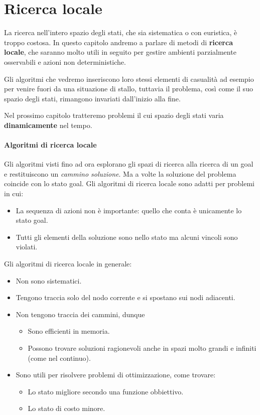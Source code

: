 \chapter{Ricerca locale} \label{chapter: ricerca_locale}
La ricerca nell'intero spazio degli stati, che sia sistematica o con euristica,
\`e troppo costosa. In questo capitolo andremo a parlare di metodi di \textbf{ricerca locale},
che saranno molto utili in seguito per gestire ambienti parzialmente osservabili e azioni non
deterministiche.

Gli algoritmi che vedremo inseriscono loro stessi elementi di casualit\`a ad esempio per venire
fuori da una situazione di stallo, tuttavia il problema, cos\`i come il suo spazio degli stati,
rimangono invariati dall'inizio alla fine.

Nel prossimo capitolo tratteremo problemi il cui spazio degli stati varia \textbf{dinamicamente} nel tempo.

\subsubsection{Algoritmi di ricerca locale}
Gli algoritmi visti fino ad ora esplorano gli spazi di ricerca alla ricerca di un
goal e restituiscono un \emph{cammino soluzione}. Ma a volte la soluzione del problema
coincide con lo stato goal. Gli algoritmi di ricerca locale sono adatti per problemi in
cui:
\begin{itemize}
	\item La sequenza di azioni non \`e importante: quello che conta \`e unicamente
	      lo stato goal.
	\item Tutti gli elementi della soluzione sono nello stato ma alcuni vincoli sono
	      violati.
\end{itemize}
Gli algoritmi di ricerca locale in generale:
\begin{itemize}
	\item Non sono sistematici.
	\item Tengono traccia solo del nodo corrente e si spostano sui nodi adiacenti.
	\item Non tengono traccia dei cammini, dunque
	      \begin{itemize}
		      \item Sono efficienti in memoria.
		      \item Possono trovare soluzioni ragionevoli anche in spazi molto grandi e
		            infiniti (come nel continuo).
	      \end{itemize}
	\item Sono utili per risolvere problemi di ottimizzazione, come trovare:
	      \begin{itemize}
		      \item Lo stato migliore secondo una funzione obbiettivo.
		      \item Lo stato di costo minore.
	      \end{itemize}
\end{itemize}


